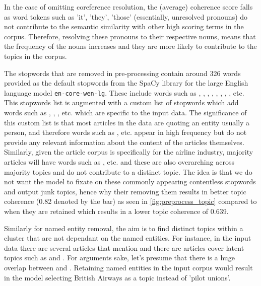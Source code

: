 In the case of omitting coreference resolution, the (average) coherence score falls as word tokens such as 'it', 'they', 'those' (essentially, unresolved pronouns) do not contribute to the semantic similarity with other high scoring terms in the corpus. Therefore, resolving these pronouns to their respective nouns, means that the frequency of the nouns increases and they are more likely to contribute to the topics in the corpus. 

The stopwords that are removed in pre-processing contain around 326 words provided as the default stopwords from the SpaCy library for the large English language model \texttt{en-core-wen-lg}. These include words such as , , , , , , , ,  etc. This stopwords list is augmented with a custom list of stopwords which add words such as , , ,  etc. which are specific to the input data. The significance of this custom list is that most articles in the data are quoting an entity usually a person, and therefore words such as  ,  etc. appear in high frequency but do not provide any relevant information about the content of the articles themselves. Similarly, given the article corpus is specifically for the airline industry, majority articles will have words such as ,  etc. and these are also overarching across majority topics and do not contribute to a distinct topic. The idea is that we do not want the model to fixate on these commonly appearing contentless stopwords and output junk topics, hence why their removing them results in better topic coherence (0.82 denoted by the  bar) as seen in \ref{fig:preprocess_topic} compared to when they are retained which results in a lower topic coherence of 0.639. 

Similarly for named entity removal, the aim is to find distinct topics within a cluster that are not dependant on the named entities. For instance, in the input data there are several articles that mention  and there are articles cover latent topics such as  and . For arguments sake, let's presume that there is a huge overlap between  and . Retaining named entities in the input corpus would result in  the model selecting British Airways as a topic instead of 'pilot unions'. 

